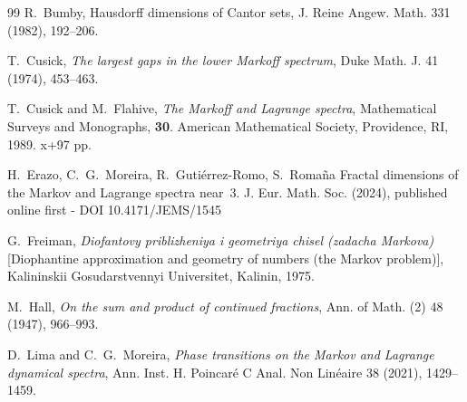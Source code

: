 \documentclass[10pt]{amsart}
\numberwithin{equation}{section}
\theoremstyle{definition}
\begin{document}
\begin{thebibliography}{99}  
 R.~Bumby, Hausdorff dimensions of Cantor sets, J. Reine Angew.
    Math. 331 (1982), 192--206.

 T.~Cusick, \emph{The largest gaps in the lower Markoff spectrum}, Duke Math. J. 41 (1974), 453--463.

 T.~Cusick and M.~Flahive, \emph{The Markoff and Lagrange spectra},
    Mathematical Surveys and Monographs, \textbf{30}. American Mathematical
    Society, Providence, RI, 1989. x+97 pp. 

 H.~Erazo, C.~G.~Moreira, R.~Guti\'errez-Romo, S.~Roma\~na
Fractal dimensions of the Markov and Lagrange spectra near~$3$.
J. Eur. Math. Soc. (2024), published online first - DOI 10.4171/JEMS/1545

 G.~Freiman, \emph{Diofantovy priblizheniya i geometriya chisel (zadacha Markova)}
[Diophantine approximation and geometry of numbers (the Markov problem)],
Kalininskii Gosudarstvennyi Universitet, Kalinin, 1975.  

 
  M.~Hall, \emph{On the sum and product of continued fractions},
     Ann. of Math. (2) 48 (1947), 966--993. 




 D.~Lima and C.~G.~Moreira, \emph{Phase transitions on the Markov and
    Lagrange dynamical spectra}, Ann. Inst. H. Poincar\'e C Anal. Non Lin\'eaire 38 (2021), 1429--1459.
    


\end{thebibliography}
\end{document}
